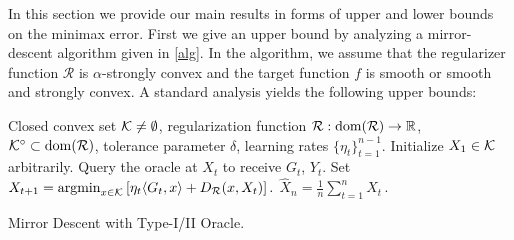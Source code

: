 In this section we provide our main results in forms of upper and lower bounds on the minimax error.
First we give an upper bound by analyzing a mirror-descent algorithm given in \cref{alg}.
In the algorithm, we assume that the regularizer function $\mathcal{R}$ is $\alpha$-strongly convex and the target function $f$ is smooth or  smooth and strongly convex. A standard analysis yields the following upper bounds:

%

\begin{algorithm}[t]
\begin{algorithmic}
      Closed convex set $\mathcal{K}\ne \emptyset$, regularization function $\mathcal{R}:\operatorname{dom}(\mathcal{R})\to \mathbb{R}$, $\mathcal{K}^{\circ}\subset \operatorname{dom}(\mathcal{R})$, tolerance parameter $\delta$, learning rates $\{\eta_t\}_{t=1}^{n-1}$.
\State Initialize $X_1\in \mathcal{K}$ arbitrarily.
	\State Query the oracle at $X_t$ to receive $G_t$, $Y_t$.
	\State Set
	$X_{t+1}=\operatorname{argmin}_{x\in \mathcal{K}}\left[ \eta_{t} \langle G_t,x \rangle+D_{\mathcal{R}}(x,X_t) \right].$
\EndFor
{} $\hat{X}_n = \frac{1}{n}\sum_{t=1}^n X_t \,.$
\end{algorithmic}
\caption{Mirror Descent with Type-I/II Oracle.}
\label{alg}
\end{algorithm}


%

